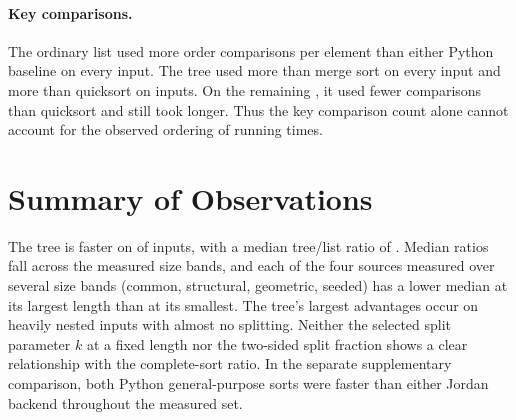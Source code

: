 \paragraph{Key comparisons.}
The ordinary list used more order comparisons per element than either
Python baseline on every input. The tree used more than merge sort on
every input and more than quicksort on \BaselineTreeMoreQuick{} inputs.
On the remaining \BaselineTreeFewerQuick{}, it used fewer comparisons than
quicksort and still took longer. Thus the key comparison count alone cannot
account for the observed ordering of running times.

\section{Summary of Observations}
The tree is faster on \UnifiedWins{} of \UnifiedN{} inputs, with a median
tree/list ratio of \UnifiedMedian{}. Median ratios fall across the measured
size bands, and each of the four sources measured over several size bands
(common, structural, geometric, seeded) has a lower median at its largest
length than at its smallest. The tree's largest advantages occur on heavily
nested inputs with almost no splitting. Neither the selected split parameter
$k$ at a fixed length nor the two-sided split fraction shows a clear
relationship with the complete-sort ratio.
In the separate supplementary comparison, both Python general-purpose sorts
were faster than either Jordan backend throughout the measured set.
